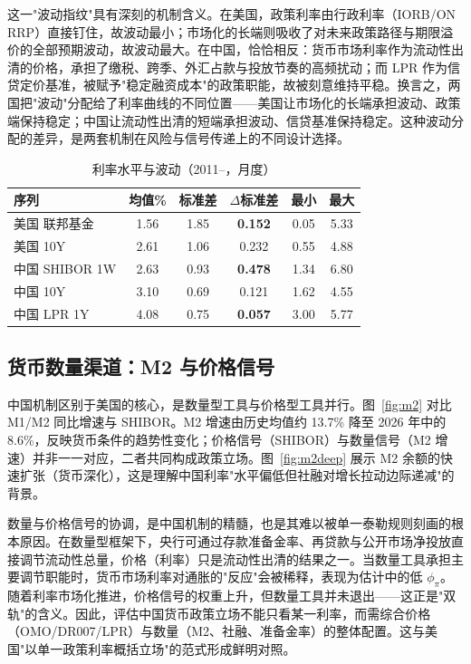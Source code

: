 \documentclass[12pt,a4paper]{ctexart}
\begin{document}
这一"波动指纹"具有深刻的机制含义。在美国，政策利率由行政利率（IORB/ON RRP）直接钉住，故波动最小；市场化的长端则吸收了对未来政策路径与期限溢价的全部预期波动，故波动最大。在中国，恰恰相反：货币市场利率作为流动性出清的价格，承担了缴税、跨季、外汇占款与投放节奏的高频扰动；而 LPR 作为信贷定价基准，被赋予"稳定融资成本"的政策职能，故被刻意维持平稳。换言之，两国把"波动"分配给了利率曲线的不同位置——美国让市场化的长端承担波动、政策端保持稳定；中国让流动性出清的短端承担波动、信贷基准保持稳定。这种波动分配的差异，是两套机制在风险与信号传递上的不同设计选择。

\begin{table}[H]
\centering
\caption{利率水平与波动（2011--，月度）}
\label{tab:vol}
\small
\begin{tabular}{l ccccc}
\toprule
序列 & 均值\% & 标准差 & $\Delta$标准差 & 最小 & 最大 \\
\midrule
美国 联邦基金 & 1.56 & 1.85 & \textbf{0.152} & 0.05 & 5.33 \\
美国 10Y & 2.61 & 1.06 & 0.232 & 0.55 & 4.88 \\
中国 SHIBOR 1W & 2.63 & 0.93 & \textbf{0.478} & 1.34 & 6.80 \\
中国 10Y & 3.10 & 0.69 & 0.121 & 1.62 & 4.55 \\
中国 LPR 1Y & 4.08 & 0.75 & \textbf{0.057} & 3.00 & 5.77 \\
\bottomrule
\end{tabular}
\end{table}

\subsection{货币数量渠道：M2 与价格信号}
中国机制区别于美国的核心，是数量型工具与价格型工具并行。图~\ref{fig:m2} 对比 M1/M2 同比增速与 SHIBOR。M2 增速由历史均值约 13.7\% 降至 2026 年中的 8.6\%，反映货币条件的趋势性变化；价格信号（SHIBOR）与数量信号（M2 增速）并非一一对应，二者共同构成政策立场。图~\ref{fig:m2deep} 展示 M2 余额的快速扩张（货币深化），这是理解中国利率"水平偏低但社融对增长拉动边际递减"的背景。

数量与价格信号的协调，是中国机制的精髓，也是其难以被单一泰勒规则刻画的根本原因。在数量型框架下，央行可通过存款准备金率、再贷款与公开市场净投放直接调节流动性总量，价格（利率）只是流动性出清的结果之一。当数量工具承担主要调节职能时，货币市场利率对通胀的"反应"会被稀释，表现为估计中的低 $\phi_\pi$。随着利率市场化推进，价格信号的权重上升，但数量工具并未退出——这正是"双轨"的含义。因此，评估中国货币政策立场不能只看某一利率，而需综合价格（OMO/DR007/LPR）与数量（M2、社融、准备金率）的整体配置。这与美国"以单一政策利率概括立场"的范式形成鲜明对照。
\end{document}
